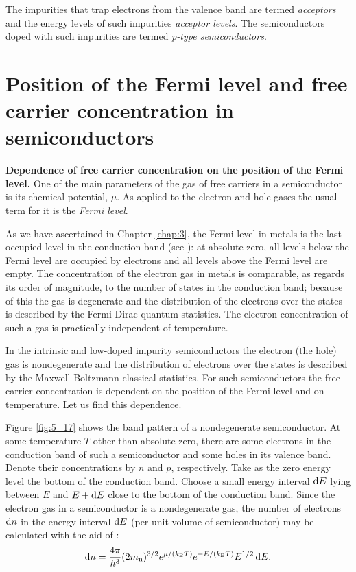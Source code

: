 The impurities that trap electrons from the valence band are termed \textit{acceptors} and the energy levels of such impurities \textit{acceptor levels}. The semiconductors doped with such impurities are termed \textit{p-type semiconductors}.

\section{Position of the Fermi level and free carrier concentration in semiconductors}\label{sec:45}

\textbf{Dependence of free carrier concentration on the position of the Fermi level.} One of the main parameters of the gas of free carriers in a semiconductor is its chemical potential, $\mu$. As applied to the electron and hole gases the usual term for it is the \textit{Fermi level}.

As we have ascertained in Chapter \ref{chap:3}, the Fermi level in metals is the last occupied level in the conduction band (see ): at absolute zero, all levels below the Fermi level are occupied by electrons and all levels above the Fermi level are empty. The concentration of the electron gas in metals is comparable, as regards its order of magnitude, to the number of states in the conduction band; because of this the gas is degenerate and the distribution of the electrons over the states is described by the Fermi-Dirac quantum statistics. The electron concentration of such a gas is practically independent of temperature.

In the intrinsic and low-doped impurity semiconductors the electron (the hole) gas is nondegenerate and the distribution of electrons over the states is described by the Maxwell-Boltzmann classical statistics. For such semiconductors the free carrier concentration is dependent on the position of the Fermi level and on temperature. Let us find this dependence.

Figure \ref{fig:5_17} shows the band pattern of a nondegenerate semiconductor. At some temperature $T$ other than absolute zero, there are some electrons in the conduction band of such a semiconductor and some holes in its valence band. Denote their concentrations by $n$ and $p$, respectively. Take as the zero energy level the bottom of the conduction band. Choose a small energy interval $\mathrm{d} E$ lying between $E$ and $E+\mathrm{d} E$ close to the bottom of the conduction band. Since the electron gas in a semiconductor is a nondegenerate gas, the number of electrons $\mathrm{d} n$ in the energy interval $\mathrm{d} E$ (per unit volume of
semiconductor) may be calculated with the aid of :
\begin{equation}\label{eq:5_29}
    \mathrm{d} n = \frac{4\pi}{h^3}(2m_{\text{n}})^{3/2} e^{\mu/(k_{\text{B}}T)} e^{-E/(k_{\text{B}}T)} E^{1/2}\, \mathrm{d} E.
\end{equation}


